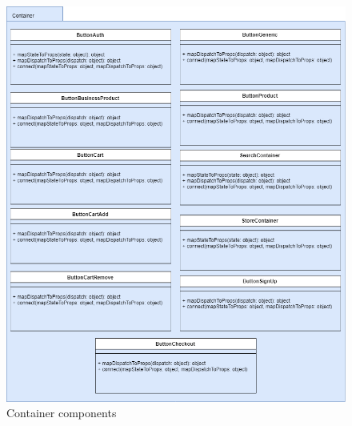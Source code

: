 \begin{figure}[H]
	\centering\includegraphics[scale = 0.5]{res/images/Container.png}
	\caption{Container components}
\end{figure}
